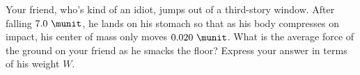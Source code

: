 Your friend, who's kind of an idiot, jumps out of a third-story
window. After falling $7.0\ \munit$, he lands on his stomach so that
as his body compresses on impact, his center of mass only moves
$0.020\ \munit$. What is the
average force of the ground on your friend as he smacks the floor?
Express your answer in terms of his weight $W$.\answercheck
